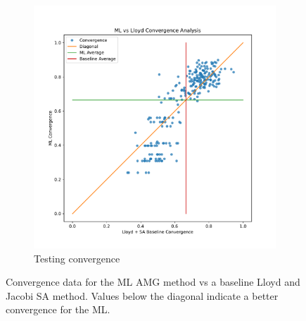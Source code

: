 \documentclass{article}
\begin{document}
\begin{figure}[h]
\begin{subfigure}[t]{0.49\textwidth}
    \includegraphics[width=\textwidth]{test_convergence.pdf}
    \caption{Testing convergence}
  \end{subfigure}
  \caption{Convergence data for the ML AMG method vs a baseline Lloyd and Jacobi SA method.  Values below the diagonal indicate a better convergence for the ML.}
  \label{fig:conv}
\end{figure}
\end{document}
